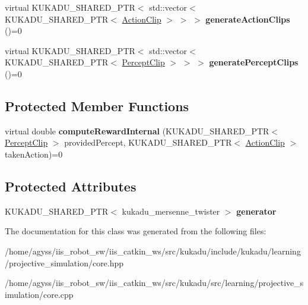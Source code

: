 \begin{DoxyCompactItemize}
\item 
virtual K\+U\+K\+A\+D\+U\+\_\+\+S\+H\+A\+R\+E\+D\+\_\+\+P\+TR$<$ std\+::vector$<$ K\+U\+K\+A\+D\+U\+\_\+\+S\+H\+A\+R\+E\+D\+\_\+\+P\+TR$<$ \hyperlink{classkukadu_1_1ActionClip}{Action\+Clip} $>$ $>$ $>$ {\bfseries generate\+Action\+Clips} ()=0\hypertarget{classkukadu_1_1Reward_ac569bee7aac35ae3f762d5769d254fc8}{}\label{classkukadu_1_1Reward_ac569bee7aac35ae3f762d5769d254fc8}

\item 
virtual K\+U\+K\+A\+D\+U\+\_\+\+S\+H\+A\+R\+E\+D\+\_\+\+P\+TR$<$ std\+::vector$<$ K\+U\+K\+A\+D\+U\+\_\+\+S\+H\+A\+R\+E\+D\+\_\+\+P\+TR$<$ \hyperlink{classkukadu_1_1PerceptClip}{Percept\+Clip} $>$ $>$ $>$ {\bfseries generate\+Percept\+Clips} ()=0\hypertarget{classkukadu_1_1Reward_a0d1addb6e9e93326d66ff7b4613cf0a0}{}\label{classkukadu_1_1Reward_a0d1addb6e9e93326d66ff7b4613cf0a0}

\end{DoxyCompactItemize}
\subsection*{Protected Member Functions}
\begin{DoxyCompactItemize}
\item 
virtual double {\bfseries compute\+Reward\+Internal} (K\+U\+K\+A\+D\+U\+\_\+\+S\+H\+A\+R\+E\+D\+\_\+\+P\+TR$<$ \hyperlink{classkukadu_1_1PerceptClip}{Percept\+Clip} $>$ provided\+Percept, K\+U\+K\+A\+D\+U\+\_\+\+S\+H\+A\+R\+E\+D\+\_\+\+P\+TR$<$ \hyperlink{classkukadu_1_1ActionClip}{Action\+Clip} $>$ taken\+Action)=0\hypertarget{classkukadu_1_1Reward_ac7893507bd165f368019bbbdfed9db9a}{}\label{classkukadu_1_1Reward_ac7893507bd165f368019bbbdfed9db9a}

\end{DoxyCompactItemize}
\subsection*{Protected Attributes}
\begin{DoxyCompactItemize}
\item 
K\+U\+K\+A\+D\+U\+\_\+\+S\+H\+A\+R\+E\+D\+\_\+\+P\+TR$<$ kukadu\+\_\+mersenne\+\_\+twister $>$ {\bfseries generator}\hypertarget{classkukadu_1_1Reward_a028df6b3a9af9353a40c0fe7394d9b50}{}\label{classkukadu_1_1Reward_a028df6b3a9af9353a40c0fe7394d9b50}

\end{DoxyCompactItemize}


The documentation for this class was generated from the following files\+:\begin{DoxyCompactItemize}
\item 
/home/agyss/iis\+\_\+robot\+\_\+sw/iis\+\_\+catkin\+\_\+ws/src/kukadu/include/kukadu/learning/projective\+\_\+simulation/core.\+hpp\item 
/home/agyss/iis\+\_\+robot\+\_\+sw/iis\+\_\+catkin\+\_\+ws/src/kukadu/src/learning/projective\+\_\+simulation/core.\+cpp\end{DoxyCompactItemize}
